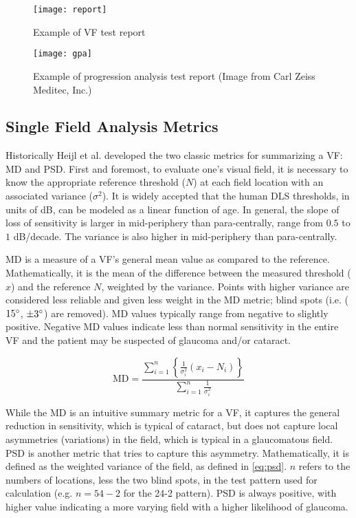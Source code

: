 \begin{figure}[p]
	\texttt{[image: report]}
	\caption{Example of  \acl{VF} test report}
	\label{fig:report}
\end{figure}

\begin{figure}[p]
	\texttt{[image: gpa]}
	\caption[An \acs{HFA} progression analysis test report]{Example of  progression analysis test report (Image from Carl Zeiss Meditec, Inc.)}
	\label{fig:gpa}
\end{figure}

\subsection{Single Field Analysis Metrics}

Historically Heijl et al. developed the two classic metrics for summarizing a \acl{VF}: \ac{MD} and \ac{PSD}. \cite{Heijl1987} First and foremost, to evaluate one's visual field, it is necessary to know the appropriate reference threshold ($N$) at each field location with an associated variance ($\sigma^2$). It is widely accepted that the human \ac{DLS} thresholds, in units of dB, can be modeled as a linear function of age. \cite{Heijl1987a} In general, the slope of loss of sensitivity is larger in mid-periphery than para-centrally, range from $0.5$ to $1$ dB/decade. The variance is also higher in mid-periphery than para-centrally. 

\ac{MD} is a measure of a \acl{VF}'s general mean value as compared to the reference. Mathematically, it is the mean of the difference between the measured threshold ($x$) and the reference $N$, weighted by the variance. Points with higher variance are considered less reliable and given less weight in the \ac{MD} metric; blind spots (i.e. ($15\degree$, $\pm3\degree$) are removed). MD values typically range from negative to slightly positive. Negative MD values indicate less than normal sensitivity in the entire \acl{VF} and the patient may be suspected of glaucoma and/or cataract.

\begin{equation} \label{eq:md}
\textrm{MD} =\frac{ 
\sum\limits_{i=1}^{n} \left\{
\frac{1}{\sigma_{i}^2} (x_i-N_i)
\right\} }{
\sum\limits_{i=1}^{n} 
\frac{1}{\sigma_{i}^2} 
}
\end{equation}

While the \ac{MD} is an intuitive summary metric for a \acl{VF}, it captures the general reduction in sensitivity, which is typical of cataract, but does not capture local asymmetries (variations) in the field, which is typical in a glaucomatous field. \ac{PSD} is another metric that tries to capture this asymmetry. Mathematically, it is defined as the weighted variance of the field, as defined in \cref{eq:psd}. $n$ refers to the numbers of locations, less the two blind spots, in the test pattern used for calculation (e.g. $n=54-2$ for the 24-2 pattern). \ac{PSD} is always positive, with higher value indicating a more varying field with a higher likelihood of glaucoma.

